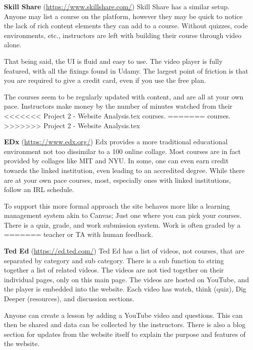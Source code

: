 \documentclass{article}
\begin{document}
\textbf{Skill Share} (\url{https://www.skillshare.com/})
Skill Share has a similar setup. Anyone may list a course on the platform,
however they may be quick to notice the lack of rich content elements they can
add to a course. Without quizzes, code environments, etc., instructors are
left with building their course through video alone.

That being said, the UI is fluid and easy to use. The video player is fully
featured, with all the fixings found in Udamy. The largest point of friction is
that you are required to give a credit card, even if you use the free
plan.

The courses seem to be regularly updated with content, and are all at your own
pace. Instructors make money by the number of minutes watched from their
<<<<<<< Project 2 - Website Analysis.tex
courses.
=======
courses. \vspace{\baselineskip}
>>>>>>> Project 2 - Website Analysis.tex

\textbf{EDx} (\url{https://www.edx.org/})
Edx provides a more traditional educational environment not too dissimilar to a 100%
online collage. Most courses are in fact provided by collages like MIT and NYU.
In some, one can even earn credit towards the linked institution, even leading
to an accredited degree. While there are at your own pace courses,
most, especially ones with linked institutions, follow an IRL schedule.

To support this more formal approach the site behaves more like a learning
management system akin to Canvas; Just one where you can pick your courses.
There is a quiz, grade, and work submission system. Work is often graded by a
=======
teacher or TA with human feedback. \vspace{\baselineskip}

\textbf{Ted Ed} (\url{https://ed.ted.com/})
Ted Ed has a list of videos, not courses, that are separated by category and sub category. There is a sub function to string together a list of related videos. The videos are not tied together on their individual pages, only on this main page. The videos are hosted on YouTube, and the player is embedded into the website. Each video has watch, think (quiz), Dig Deeper (resources), and discussion sections.

Anyone can create a lesson by adding a YouTube video and questions. This can then be shared and data can be collected by the instructors. There is also a blog section for updates from the website itself to explain the purpose and features of the website. \vspace{\baselineskip}
\end{document}
